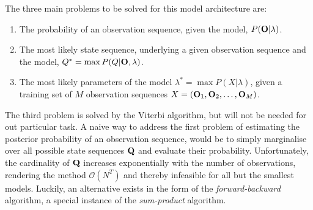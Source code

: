 \documentclass[conference]{IEEEtran}
\begin{document}
The three main problems to be solved for this model architecture are:
\begin{enumerate}
 \item The probability of an observation sequence, given the model, $P({\bf O}|\lambda)$.
 \item The most likely state sequence, underlying a given observation sequence and the model, $Q^* = \max P(Q|{\bf O},\lambda)$.
 \item The most likely parameters of the model $\lambda^* = \max P(X|\lambda)$, given a training set of $M$ observation sequences $X = ({\bf O}_{1}, {\bf O}_{2}, \ldots, {\bf O}_{M} )$.
\end{enumerate}
The third problem is solved by the Viterbi algorithm, but will not be needed for out particular task. A naive way to address the first problem of estimating the posterior probability of an observation sequence, would be to simply marginalise over all possible state sequences ${\bf Q}$ and evaluate their probability. Unfortunately, the cardinality of ${\bf Q}$ increases exponentially with the number of observations, rendering the method $\mathcal{O}(N^{T})$ and thereby infeasible for all but the smallest models. Luckily, an alternative exists in the form of the {\it forward-backward} algorithm, a special instance of the {\it sum-product} algorithm.
\end{document}
